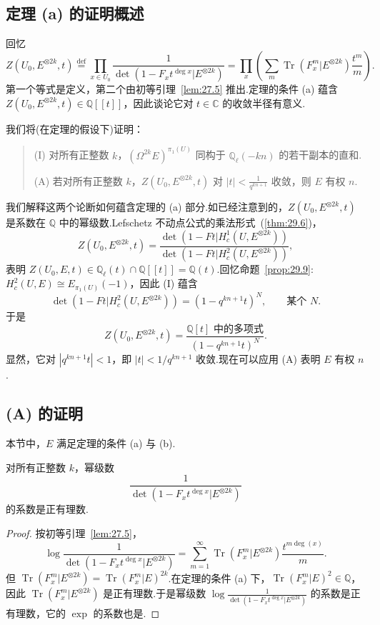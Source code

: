\subsection*{定理 (a) 的证明概述}

回忆
\[
Z(U_0, E^{\otimes 2k}, t) \overset{\mathrm{def}}{=} \prod_{x \in U_0} \frac{1}{\det(1 - F_x t^{\deg x}|E^{\otimes 2k})} = \prod_{x} \left( \sum_{m} \operatorname{Tr}(F^{m}_x|E^{\otimes 2k}) \frac{t^{m}}{m} \right).
\]
第一个等式是定义，第二个由初等引理~\ref{lem:27.5} 推出.定理的条件 (a) 蕴含 $Z(U_0, E^{\otimes 2k}, t) \in \mathbb{Q}[[t]]$，因此谈论它对 $t \in \mathbb{C}$ 的收敛半径有意义.

我们将(在定理的假设下)证明：
\begin{quote}
(I) 对所有正整数 $k$，$(\Omega^{2k}E)^{\pi_1(U)}$ 同构于 $\mathbb{Q}_{\ell}(-kn)$ 的若干副本的直和.

(A) 若对所有正整数 $k$，$Z(U_0, E^{\otimes 2k}, t)$ 对 $|t| < \frac{1}{q^{kn+1}}$ 收敛，则 $E$ 有权 $n$.
\end{quote}
我们解释这两个论断如何蕴含定理的 (a) 部分.如已经注意到的，$Z(U_0, E^{\otimes 2k}, t)$ 是系数在 $\mathbb{Q}$ 中的幂级数.Lefschetz 不动点公式的乘法形式~(\ref{thm:29.6})，
\[
Z(U_0, E^{\otimes 2k}, t) = \frac{\det(1 - Ft|H^{1}_{c}(U, E^{\otimes 2k}))}{\det(1 - Ft|H^{2}_{c}(U, E^{\otimes 2k}))},
\]
表明 $Z(U_0, E, t) \in \mathbb{Q}_{\ell}(t) \cap \mathbb{Q}[[t]] = \mathbb{Q}(t)$.回忆命题~\ref{prop:29.9}: $H^{2}_{c}(U, E) \cong E_{\pi_1(U)}(-1)$，因此 (I) 蕴含
\[
\det(1 - Ft|H^{2}_{c}(U, E^{\otimes 2k})) = (1 - q^{kn+1}t)^{N}, \qquad \text{某个 } N.
\]
于是
\[
Z(U_0, E^{\otimes 2k}, t) = \frac{\mathbb{Q}[t] \text{ 中的多项式}}{(1 - q^{kn+1}t)^{N}}.
\]
显然，它对 $|q^{kn+1}t| < 1$，即 $|t| < 1/q^{kn+1}$ 收敛.现在可以应用 (A) 表明 $E$ 有权 $n$.

\subsection*{(A) 的证明}

本节中，$E$ 满足定理的条件 (a) 与 (b).

\begin{lemma}\label{lem:30.8}
对所有正整数 $k$，幂级数
\[
\frac{1}{\det(1 - F_x t^{\deg x}|E^{\otimes 2k})}
\]
的系数是正有理数.
\end{lemma}

\begin{proof}
按初等引理~\ref{lem:27.5}，
\[
\log \frac{1}{\det(1 - F_x t^{\deg x}|E^{\otimes 2k})} = \sum_{m=1}^{\infty} \operatorname{Tr}(F^{m}_x|E^{\otimes 2k}) \frac{t^{m \deg(x)}}{m}.
\]
但 $\operatorname{Tr}(F^{m}_x|E^{\otimes 2k}) = \operatorname{Tr}(F^{m}_x|E)^{2k}$.在定理的条件 (a) 下，$\operatorname{Tr}(F^{m}_x|E)^{2} \in \mathbb{Q}$，因此 $\operatorname{Tr}(F^{m}_x|E^{\otimes 2k})$ 是正有理数.于是幂级数 $\log \frac{1}{\det(1 - F_x t^{\deg x}|E^{\otimes 2k})}$ 的系数是正有理数，它的 $\exp$ 的系数也是.
\end{proof}

